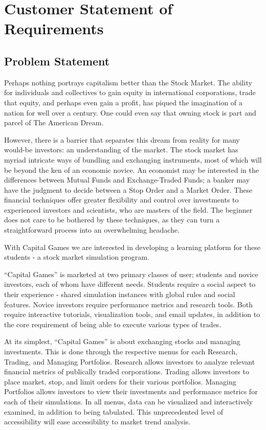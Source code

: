 \chapter{Customer Statement of Requirements}

\section{Problem Statement}

Perhaps nothing portrays capitalism better than the Stock Market. The ability for individuals and collectives to gain equity in international corporations, trade that equity, and perhaps even gain a profit, has piqued the imagination of a nation for well over a century. One could even say that owning stock is part and parcel of The American Dream.  

However, there is a barrier that separates this dream from reality for many would-be investors: an understanding of the market. The stock market has myriad intricate ways of bundling and exchanging instruments, most of which will be beyond the ken of an economic novice. An economist may be interested in the differences between Mutual Funds and Exchange-Traded Funds; a banker may have the judgment to decide between a Stop Order and a Market Order. These financial techniques offer greater flexibility and control over investments to experienced investors and scientists, who are masters of the field. The beginner does not care to be bothered by these techniques, as they can turn a straightforward process into an overwhelming headache.

With Capital Games we are interested in developing a learning platform for these students - a stock market simulation program. 

“Capital Games” is marketed at two primary classes of user; students and novice investors, each of whom have different needs. Students require a social aspect to their experience - shared simulation instances with global rules and social features. Novice investors require performance metrics and research tools. Both require interactive tutorials, visualization tools, and email updates, in addition to the core requirement of being able to execute various types of trades.

At its simplest, “Capital Games” is about exchanging stocks and managing investments. This is done through the respective menus for each Research, Trading, and Managing Portfolios. Research allows investors to analyze relevant financial metrics of publically traded corporations. Trading allows investors to place market, stop, and limit orders for their various portfolios. Managing Portfolios allows investors to view their investments and performance metrics for each of their simulations. In all menus, data can be visualized and interactively examined, in addition to being tabulated. This unprecedented level of accessibility will ease accessibility to market trend analysis.

